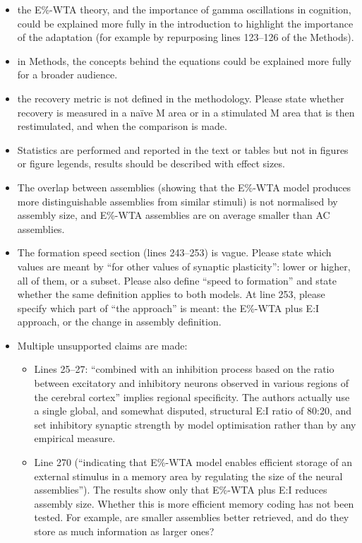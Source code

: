 \documentclass[a4paper, 11pt]{article}
\begin{document}
\begin{itemize}
    \item the E\%-WTA theory, and the importance of gamma oscillations in cognition, could be explained more fully in the introduction to highlight the importance of the adaptation (for example by repurposing lines 123--126 of the Methods).
    \item in Methods, the concepts behind the equations could be explained more fully for a broader audience.
    \item the recovery metric is not defined in the methodology. Please state whether recovery is measured in a na\"ive M area or in a stimulated M area that is then restimulated, and when the comparison is made.
    \item Statistics are performed and reported in the text or tables but not in figures or figure legends, results should be described with effect sizes.
    \item The overlap between assemblies (showing that the E\%-WTA model produces more distinguishable assemblies from similar stimuli) is not normalised by assembly size, and E\%-WTA assemblies are on average smaller than AC assemblies.
    \item The formation speed section (lines 243--253) is vague. Please state which values are meant by ``for other values of synaptic plasticity'': lower or higher, all of them, or a subset. Please also define ``speed to formation'' and state whether the same definition applies to both models. At line 253, please specify which part of ``the approach'' is meant: the E\%-WTA plus E:I approach, or the change in assembly definition.
    \item Multiple unsupported claims are made:
    \begin{itemize}
        \item Lines 25--27: ``combined with an inhibition process based on the ratio between excitatory and inhibitory neurons observed in various regions of the cerebral cortex'' implies regional specificity. The authors actually use a single global, and somewhat disputed, structural E:I ratio of 80:20, and set inhibitory synaptic strength by model optimisation rather than by any empirical measure.
        \item Line 270 (``indicating that E\%-WTA model enables efficient storage of an external stimulus in a memory area by regulating the size of the neural assemblies''). The results show only that E\%-WTA plus E:I reduces assembly size. Whether this is more efficient memory coding has not been tested. For example, are smaller assemblies better retrieved, and do they store as much information as larger ones?

\end{itemize}
\end{itemize}
\end{document}
